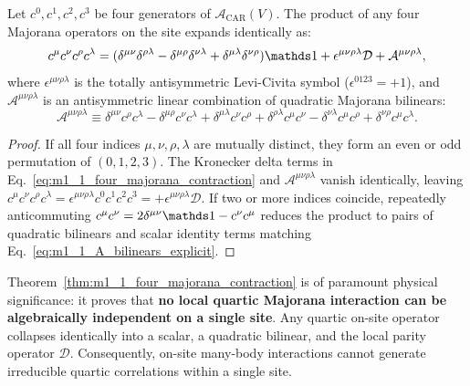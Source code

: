 \begin{theorem}
\label{thm:m1_1_four_majorana_contraction}
Let $c^0, c^1, c^2, c^3$ be four generators of $\mathcal{A}_{\mathrm{CAR}}(V)$. The product of any four Majorana operators on the site expands identically as:
\begin{equation}
\label{eq:m1_1_four_majorana_contraction}
c^\mu c^\nu c^\rho c^\lambda = (\delta^{\mu\nu}\delta^{\rho\lambda} - \delta^{\mu\rho}\delta^{\nu\lambda} + \delta^{\mu\lambda}\delta^{\nu\rho})\Id + \epsilon^{\mu\nu\rho\lambda}\mathcal{D} + \mathcal{A}^{\mu\nu\rho\lambda},
\end{equation}
where $\epsilon^{\mu\nu\rho\lambda}$ is the totally antisymmetric Levi-Civita symbol ($\epsilon^{0123} = +1$), and $\mathcal{A}^{\mu\nu\rho\lambda}$ is an antisymmetric linear combination of quadratic Majorana bilinears:
\begin{equation}
\label{eq:m1_1_A_bilinears_explicit}
\mathcal{A}^{\mu\nu\rho\lambda} \equiv \delta^{\mu\nu} c^\rho c^\lambda - \delta^{\mu\rho} c^\nu c^\lambda + \delta^{\mu\lambda} c^\nu c^\rho + \delta^{\rho\lambda} c^\mu c^\nu - \delta^{\nu\lambda} c^\mu c^\rho + \delta^{\nu\rho} c^\mu c^\lambda.
\end{equation}
\end{theorem}
\begin{proof}
If all four indices $\mu, \nu, \rho, \lambda$ are mutually distinct, they form an even or odd permutation of $(0, 1, 2, 3)$. The Kronecker delta terms in Eq.~\eqref{eq:m1_1_four_majorana_contraction} and $\mathcal{A}^{\mu\nu\rho\lambda}$ vanish identically, leaving $c^\mu c^\nu c^\rho c^\lambda = \epsilon^{\mu\nu\rho\lambda} c^0 c^1 c^2 c^3 = +\epsilon^{\mu\nu\rho\lambda}\mathcal{D}$. If two or more indices coincide, repeatedly anticommuting $c^\mu c^\nu = 2\delta^{\mu\nu}\Id - c^\nu c^\mu$ reduces the product to pairs of quadratic bilinears and scalar identity terms matching Eq.~\eqref{eq:m1_1_A_bilinears_explicit}.
\end{proof}

\begin{remark}
Theorem~\ref{thm:m1_1_four_majorana_contraction} is of paramount physical significance: it proves that \textbf{no local quartic Majorana interaction can be algebraically independent on a single site}. Any quartic on-site operator collapses identically into a scalar, a quadratic bilinear, and the local parity operator $\mathcal{D}$. Consequently, on-site many-body interactions cannot generate irreducible quartic correlations within a single site.
\end{remark}

